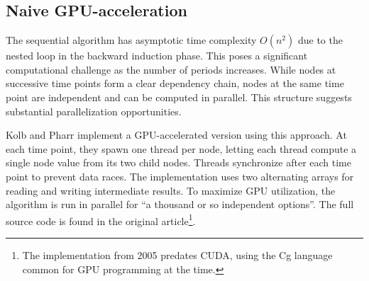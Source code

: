 \documentclass[english,12pt,a4paper,pdftex,sci,utf8]{aaltothesis}
\begin{document}
\subsection{Naive GPU-acceleration}
The sequential algorithm has asymptotic time complexity $O(n^2)$ due to the nested loop in the backward induction phase. This poses a significant computational challenge as the number of periods increases. While nodes at successive time points form a clear dependency chain, nodes at the same time point are independent and can be computed in parallel. This structure suggests substantial parallelization opportunities.

Kolb and Pharr \cite{pharr2005gpu} implement a GPU-accelerated version using this approach. At each time point, they spawn one thread per node, letting each thread compute a single node value from its two child nodes. Threads synchronize after each time point to prevent data races. The implementation uses two alternating arrays for reading and writing intermediate results. To maximize GPU utilization, the algorithm is run in parallel for ``a thousand or so independent options''. The full source code is found in the original article\footnote{The implementation from 2005 predates CUDA, using the Cg language common for GPU programming at the time.}.
\end{document}
